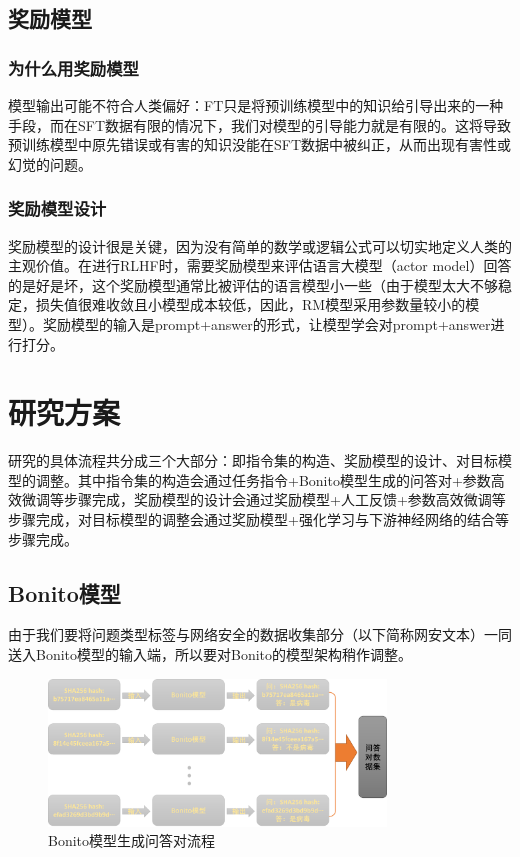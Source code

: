 \subsection{奖励模型}
\subsubsection{为什么用奖励模型}
模型输出可能不符合人类偏好：FT只是将预训练模型中的知识给引导出来的一种手段，而在SFT数据有限的情况下，我们对模型的引导能力就是有限的。这将导致预训练模型中原先错误或有害的知识没能在SFT数据中被纠正，从而出现有害性或幻觉\cite{Ye2023CognitiveMA}的问题。
\subsubsection{奖励模型设计}
奖励模型的设计很是关键，因为没有简单的数学或逻辑公式可以切实地定义人类的主观价值。在进行RLHF时，需要奖励模型来评估语言大模型（actor model）回答的是好是坏，这个奖励模型通常比被评估的语言模型小一些（由于模型太大不够稳定，损失值很难收敛且小模型成本较低，因此，RM模型采用参数量较小的模型）。奖励模型的输入是prompt+answer的形式，让模型学会对prompt+answer进行打分。

\section{研究方案}
研究的具体流程共分成三个大部分：即指令集的构造、奖励模型的设计、对目标模型的调整。其中指令集的构造会通过任务指令+Bonito模型生成的问答对+参数高效微调等步骤完成，奖励模型的设计会通过奖励模型+人工反馈+参数高效微调等步骤完成，对目标模型的调整会通过奖励模型+强化学习与下游神经网络的结合等步骤完成。

\subsection{Bonito模型}
由于我们要将问题类型标签与网络安全的数据收集部分（以下简称网安文本）一同送入Bonito模型的输入端，所以要对Bonito的模型架构稍作调整。
\begin{figure}[htbp]
    \centering
    \includegraphics[width=0.8\textwidth]{./img/prompt.png}
    \caption{Bonito模型生成问答对流程}\label{fig:bonito}
\end{figure}

